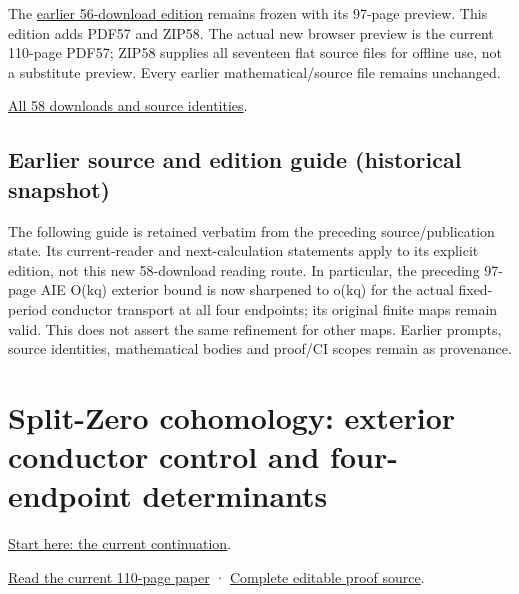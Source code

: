 \documentclass[
]{article}
\begin{document}
The \href{https://doi.org/10.5281/zenodo.22758735}{earlier 56-download
edition} remains frozen with its 97-page preview. This edition adds
PDF57 and ZIP58. The actual new browser preview is the current 110-page
PDF57; ZIP58 supplies all seventeen flat source files for offline use,
not a substitute preview. Every earlier mathematical/source file remains
unchanged.

\href{calculation_edition_20260915_exterior_kernel/README.md}{All 58
downloads and source identities}.

\subsection{Earlier source and edition guide (historical
snapshot)}\label{earlier-source-and-edition-guide-historical-snapshot-10}

The following guide is retained verbatim from the preceding
source/publication state. Its current-reader and next-calculation
statements apply to its explicit edition, not this new 58-download
reading route. In particular, the preceding 97-page AIE O(kq) exterior
bound is now sharpened to o(kq) for the actual fixed-period conductor
transport at all four endpoints; its original finite maps remain valid.
This does not assert the same refinement for other maps. Earlier
prompts, source identities, mathematical bodies and proof/CI scopes
remain as provenance.

\section{Split-Zero cohomology: exterior conductor control and
four-endpoint
determinants}\label{split-zero-cohomology-exterior-conductor-control-and-four-endpoint-determinants-1}

\href{https://github.com/KokunoYumeto/zeta-function-research-reader/blob/main/workbenches/splitzero-tandem/continuations/20260914-exterior-kernel-continuation/00_CONTINUE_HERE.md}{Start
here: the current continuation}.

\href{https://github.com/KokunoYumeto/zeta-function-research-reader/blob/main/workbenches/splitzero-tandem/continuations/20260914-exterior-kernel-continuation/15_CURRENT_MIXED_CONTROL_READER.pdf}{Read
the current 110-page paper} ·
\href{https://github.com/KokunoYumeto/zeta-function-research-reader/blob/main/workbenches/splitzero-tandem/continuations/20260914-exterior-kernel-continuation/14_CURRENT_KERNEL_AND_MULTIPLICITY_PROOFS.tex}{Complete
editable proof source}.
\end{document}

